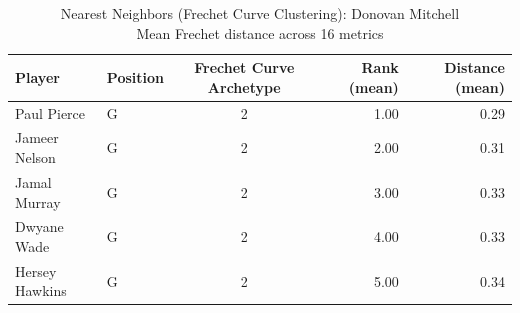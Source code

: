 \begin{table}[t]
\caption*{
{\fontsize{20}{25} Nearest Neighbors (Frechet Curve Clustering): Donovan Mitchell\fontsize{12}{15}\selectfont } \\ 
{\fontsize{14}{17}\selectfont  Mean Frechet distance across 16 metrics\fontsize{12}{15}\selectfont }
} 
\fontsize{12.0pt}{14.0pt}\selectfont
\begin{tabular*}{\linewidth}{@{\extracolsep{\fill}}llcrr}
\toprule
Player & Position & Frechet Curve Archetype & Rank (mean) & Distance (mean) \\ 
\midrule\addlinespace[2.5pt]
Paul Pierce & G & 2 & 1.00 & 0.29 \\ 
Jameer Nelson & G & 2 & 2.00 & 0.31 \\ 
Jamal Murray & G & 2 & 3.00 & 0.33 \\ 
Dwyane Wade & G & 2 & 4.00 & 0.33 \\ 
Hersey Hawkins & G & 2 & 5.00 & 0.34 \\ 
\bottomrule
\end{tabular*}
\end{table}

